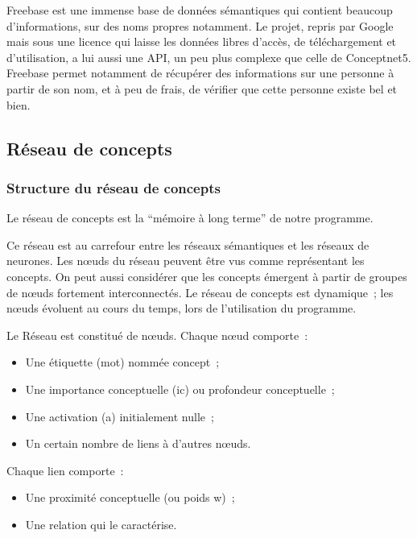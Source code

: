 \documentclass[a4paper, 12pt]{article}
\begin{document}
Freebase est une immense base de données sémantiques qui contient beaucoup d'informations, sur des noms propres notamment. Le projet, repris par Google mais sous une licence qui laisse les données libres d'accès, de téléchargement et d'utilisation, a lui aussi une API, un peu plus complexe que celle de Conceptnet5. Freebase permet notamment de récupérer des informations sur une personne à partir de son nom, et à peu de frais, de vérifier que cette personne existe bel et bien.


\subsection{Réseau de concepts}

\subsubsection{Structure du réseau de concepts}

\begin{definition}
Le réseau de concepts est la ``mémoire à long terme'' de notre programme.

Ce réseau est au carrefour entre les réseaux sémantiques et les réseaux de neurones. Les nœuds du réseau peuvent être vus comme représentant les concepts. On peut aussi considérer que les concepts émergent à partir de groupes de n\oe{}uds fortement interconnectés. Le réseau de concepts est dynamique~; les nœuds évoluent au cours du temps, lors de l'utilisation du programme.
\end{definition}


Le Réseau est constitué de n\oe{}uds. Chaque n\oe{}ud comporte~:
\begin{itemize}
  \item Une étiquette (mot) nommée concept~;
 \item Une importance conceptuelle (ic) ou profondeur conceptuelle~;
 \item Une activation (a) initialement nulle~;
 \item Un certain nombre de liens à d'autres n\oe{}uds.
\end{itemize}

Chaque lien comporte~:
\begin{itemize}
 \item Une proximité conceptuelle (ou poids w)~;
 \item Une relation qui le caractérise.
\end{itemize}
\end{document}
